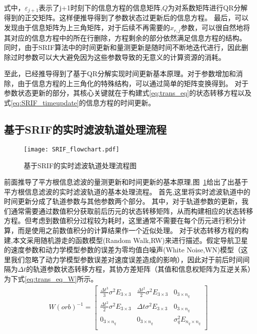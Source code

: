 式中，\(\varepsilon_{j+1}\)表示了j+1时刻下的信息方程的信息矩阵,\(Q\)为对系数矩阵进行QR分解得到的正交矩阵。这样便推导得到了参数状态过更新后的信息方程。
最后，可以发现由于信息矩阵为上三角矩阵，对于后续不再需要的\(x_{r,j}\)参数，可以很自然地将其对应的信息方程中的所在行删除，方程剩余的部分依然满足信息方程的结构。
同时，由于SRIF算法中的时间更新和量测更新是随时间不断地迭代进行，因此删除过时参数可以大大避免因为这些参数导致的无意义的计算资源的消耗。

至此，已经推导得到了基于QR分解实现时间更新基本原理。对于参数增加和消除，由于信息方程的上三角化的特殊结构，可以通过简单的矩阵变换得到。
对于参数状态更新的部分，其核心关键就在于构建式\eqref{eq:trans_eq}的状态转移方程以及式\eqref{eq:SRIF_timeupdate}的信息方程的时间更新。

\subsection{基于SRIF的实时滤波轨道处理流程}
\begin{figure}
  \centering
  \texttt{[image: SRIF\_flowchart.pdf]}
  \caption{基于SRIF的实时滤波轨道处理流程图}
  \label{fig:SRIF_flowchart}
\end{figure}
前面推导了平方根信息滤波的量测更新和时间更新的基本原理,图~\ref{fig:SRIF_flowchart}给出了出基于平方根信息滤波的实时滤波轨道的基本处理流程。
首先,这里将实时滤波轨道中的时间更新分成了轨道参数与其他参数两个部分。
其中，对于轨道参数的更新，我们通常需要通过数值积分获取前后历元的状态转移矩阵，从而构建相应的状态转移方程。但考虑到数值积分过程较为耗时，这里通常不需要在每个历元进行积分计算，而是使用之前数值积分的计算结果作一个近似处理。
对于状态转移方程的构建,本文采用随机游走的函数模型(Random Walk,RW)来进行描述。假定导航卫星的速度参数和动力学模型参数的误差为零均值白噪声(White Noise,WN)模型（这里我们忽略了动力学模型参数误差对速度误差造成的影响），因此对于前后时间间隔为\(\Delta t\)的轨道参数状态转移方程，其协方差矩阵（其值和信息权矩阵为互逆关系）为下式\eqref{eq:trans_eq_W}所示。
\begin{equation}
	\begin{aligned}
		W(orb)^{-1}=
		\begin{bmatrix}
			\frac{\Delta t^{3}}{3}\sigma^{2}E_{3\times3} & 
			\frac{\Delta t^{2}}{2}\sigma^{2}E_{3\times3} &
			0_{3\times n_{q}} \\
			\frac{\Delta t^{2}}{2}\sigma^{2}E_{3\times3} & 
			\Delta t\sigma^{2}E_{3\times3} &
			0_{3\times n_{q}} \\
			0_{3\times n_{q}} &
			0_{3\times n_{q}} &
			\sigma_{q}^{2}E_{n_{q}\times n_{q}} \\
		\end{bmatrix}
	\end{aligned}	
	\label{eq:trans_eq_W}
\end{equation}
